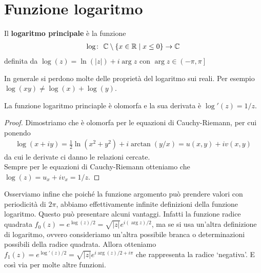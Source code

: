 \section{Funzione logaritmo}
	
	\begin{definition}
		\label{defn:logaritmo-principale}
		Il \textbf{logaritmo principale} è la funzione 
		\begin{equation}
		\begin{aligned}	
			\log \colon\ \mathbb{C} \setminus \{x \in \mathbb{R} \mid x \le 0\} \rightarrow \mathbb{C}
		\end{aligned}
		\end{equation}
		definita da $\log(z) = \ln(|z|) + i\arg z$ con $\arg z \in \left(-\pi,\pi\right]$ 
	\end{definition}

	\begin{remark}
		In generale si perdono molte delle proprietà del logaritmo sui reali. Per esempio $\log(xy) \neq \log(x)+\log(y)$.
	\end{remark}

	\begin{theorem}
		La funzione logaritmo princiaple è olomorfa e la sua derivata è $\log'(z) = 1/z$.
	\end{theorem}
	\begin{proof}
		Dimostriamo che è olomorfa per le equazioni di Cauchy-Riemann, per cui ponendo
		\begin{equation}
		\begin{aligned}
			\log(x+iy) = \frac{1}{2}\ln(x^2 + y^2) + i\arctan(y/x) = u(x,y) + iv(x,y)
		\end{aligned}
		\end{equation}
		da cui le derivate ci danno le relazioni cercate.\\
		
		Sempre per le equazioni di Cauchy-Riemann otteniamo che $\log(z) = u_x + iv_x = 1/z$.
	\end{proof}
	\begin{remark}
		Osserviamo infine che poiché la funzione argomento può prendere valori con periodicità di $2\pi$, abbiamo effettivamente infinite definizioni della funzione logaritmo. Questo può presentare alcuni vantaggi. Infatti la funzione radice quadrata 
		$f_0(z) = e^{\log(z)/2} = \sqrt{|z|}e^{i(\arg z)/2}$, ma se si usa un'altra definizione di logaritmo, ovvero consideriamo un'altra possibile branca o determinazioni possibili della radice quadrata. Allora otteniamo $f_1(z) = e^{\log'(z)/2} = \sqrt{|z|}e^{i\arg(z)/2 + i\pi}$ che rappresenta la radice `negativa'. E così via per molte altre funzioni.
	\end{remark}
